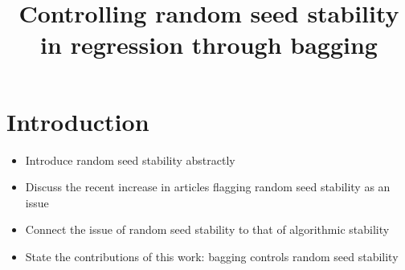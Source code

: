 \documentclass[ejsv2]{imsart}
\theoremstyle{plain}
\theoremstyle{definition}
\theoremstyle{remark}
\begin{document}
\begin{frontmatter}
\title{Controlling random seed stability in regression through bagging}


\begin{abstract}

\end{abstract}

\begin{keyword}[class=MSC]
\end{keyword}

\begin{keyword}
\end{keyword}

\end{frontmatter}

\section{Introduction}

\begin{itemize}
\item Introduce random seed stability abstractly
\item Discuss the recent increase in articles flagging random seed stability as an issue
\item Connect the issue of random seed stability to that of algorithmic stability
\item State the contributions of this work: bagging controls random seed stability
\end{itemize}
\end{document}
